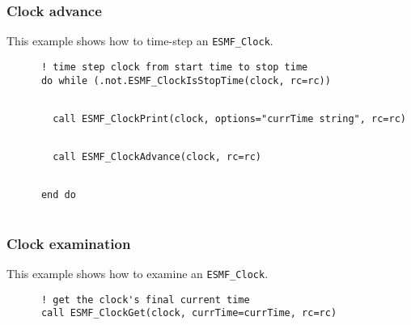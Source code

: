 
  \subsubsection{Clock advance}
 
   This example shows how to time-step an {\tt ESMF\_Clock}. 

 \begin{verbatim}
      ! time step clock from start time to stop time
      do while (.not.ESMF_ClockIsStopTime(clock, rc=rc))
 
\end{verbatim}
 

 \begin{verbatim}
        call ESMF_ClockPrint(clock, options="currTime string", rc=rc)
 
\end{verbatim}
 

 \begin{verbatim}
        call ESMF_ClockAdvance(clock, rc=rc)
 
\end{verbatim}
 

 \begin{verbatim}
      end do
 
\end{verbatim}
 

  \subsubsection{Clock examination}
 
   This example shows how to examine an {\tt ESMF\_Clock}. 

 \begin{verbatim}
      ! get the clock's final current time
      call ESMF_ClockGet(clock, currTime=currTime, rc=rc)
 
\end{verbatim}
 
